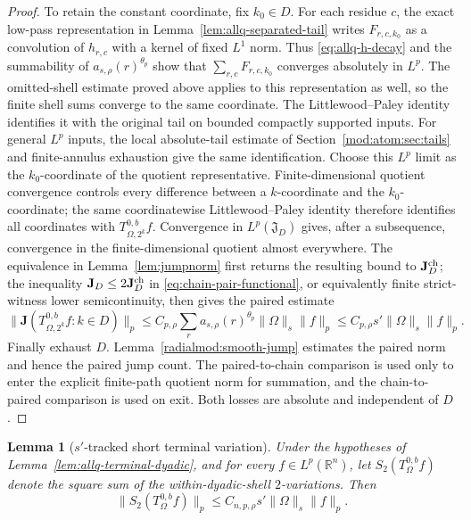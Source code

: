 \documentclass[11pt]{article}
\numberwithin{equation}{section}
\newtheorem{lemma}[theorem]{Lemma}
\theoremstyle{remark}
\theoremstyle{definition}
\newcommand{\R}{\mathbb R}
\begin{document}
\begin{proof}
To retain the constant coordinate, fix $k_0\in D$. For each residue
$c$, the exact low-pass representation in
Lemma~\ref{lem:allq-separated-tail} writes $F_{r,c,k_0}$ as a convolution
of $h_{r,c}$ with a kernel of fixed $L^1$ norm. Thus
\eqref{eq:allq-h-decay} and the summability of
$a_{s,\rho}(r)^{\theta_p}$ show that
$\sum_{r,c}F_{r,c,k_0}$ converges absolutely in $L^p$.
The omitted-shell estimate proved above applies to this representation
as well, so the finite shell sums converge to the same coordinate.
The Littlewood--Paley identity identifies it with the original tail
on bounded compactly supported inputs. For general $L^p$ inputs,
the local absolute-tail estimate of Section~\ref{mod:atom:sec:tails}
and finite-annulus exhaustion give the same identification. Choose
this $L^p$ limit as the $k_0$-coordinate of the quotient representative.
Finite-dimensional quotient convergence
controls every difference between a $k$-coordinate and the
$k_0$-coordinate; the same coordinatewise Littlewood--Paley identity
therefore identifies all coordinates with
$T^{0,b}_{\Omega,2^k}f$.  Convergence in $L^p(\mathfrak J_D)$ gives, after
a subsequence, convergence in the finite-dimensional quotient almost
everywhere.  The equivalence in Lemma~\ref{lem:jumpnorm} first returns the
resulting bound to $\mathbf J^{\rm ch}_D$; the inequality
$\mathbf J_D\le2\mathbf J^{\rm ch}_D$ in
\eqref{eq:chain-pair-functional}, or equivalently finite strict-witness
lower semicontinuity, then gives the paired estimate
\[
 \|\mathbf J(T^{0,b}_{\Omega,2^k}f:k\in D)\|_p
 \le C_{p,\rho}\sum_r a_{s,\rho}(r)^{\theta_p}
 \|\Omega\|_s\|f\|_p
 \le C_{p,\rho}s'\|\Omega\|_s\|f\|_p.
\]
Finally exhaust $D$. Lemma~\ref{radialmod:smooth-jump} estimates the
paired norm and hence the paired jump count. The paired-to-chain
comparison is used only
to enter the explicit finite-path quotient norm for summation, and the chain-to-paired
comparison is used on exit.  Both losses are absolute and independent of
$D$.
\end{proof}

\begin{lemma}[$s'$-tracked short terminal variation]
\label{lem:allq-terminal-short}
Under the hypotheses of Lemma~\ref{lem:allq-terminal-dyadic}, and for
every $f\in L^p(\R^n)$, let
$S_2(T^{0,b}_\Omega f)$ denote the square sum of the within-dyadic-shell
$2$-variations. Then
\begin{equation}\label{eq:allq-terminal-short}
 \|S_2(T^{0,b}_\Omega f)\|_p
 \le C_{n,p,\rho}s'\|\Omega\|_s\|f\|_p.
\end{equation}
\end{lemma}
\end{document}
